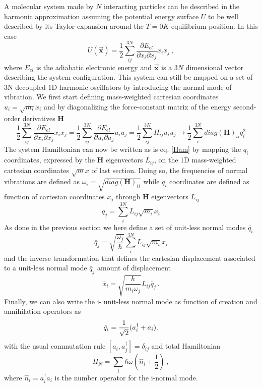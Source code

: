\documentclass[%
 reprint,onecolumn,
 amsmath,amssymb,
aps,
]{revtex4-1}
\begin{document}
A molecular system made by $N$ interacting particles can be described in the harmonic approximation assuming the potential energy surface $U$ to be well described by its Taylor expansion around the $T=0 K$ equilibrium position. In this case 
%
\begin{equation}
U(\vec{\mathbf{x}})=\frac{1}{2}\sum_{ij}^{3N}\frac{\partial E_{el}}{\partial x_{i}\partial x_{j}}x_{i}x_{j}\:,
\end{equation} 
%
where $E_{el}$ is the adiabatic electronic energy and $\vec{\mathbf{x}}$ is a $3N$ dimensional vector describing the system configuration. 
This system can still be mapped on a set of 3N decoupled 1D harmonic oscillators by introducing the normal mode of vibration. We first start defining mass-weighted cartesian coordinates $u_{i}=\sqrt{m_{i}}x_{i}$ and by diagonalizing the force-constant matrix of the energy second-order derivatives $\mathbf{H}$
%
\begin{equation}
\frac{1}{2}\sum_{ij}^{3N}\frac{\partial E_{el}}{\partial x_{i}\partial x_{j}}x_{i}x_{j}=\frac{1}{2}\sum_{ij}^{3N}\frac{\partial E_{el}}{\partial u_{i}\partial u_{j}}u_{i}u_{j}=\frac{1}{2}\sum_{ij}^{3N}H_{ij}u_{i}u_{j} \rightarrow \frac{1}{2}\sum_{i}^{3N}\textit{diag}(\mathbf{H})_{ii}q^{2}_{i}
\label{diagH}
\end{equation}
%
The system Hamiltonian can now be written as is eq. \ref{Ham} by mapping the $q_{i}$ coordinates, expressed by the $\mathbf{H}$ eigenvectors $L_{ij}$, on the 1D mass-weighted cartesian coordinates $\sqrt{m}x$ of last section. Doing so, the frequencies of normal vibrations are defined as $\omega_{i}=\sqrt{\textit{diag}(\mathbf{H})_{ii}}$ while $q_{i}$ coordinates are defined as function of cartesian coordinates $x_{j}$ through $\mathbf{H}$ eigenvectors $L_{ij}$
%
\begin{equation}
q_{j}=\sum_{i}^{3N}L_{ij}\sqrt{m_{i}}x_{i}
\end{equation}
%
As done in the previous section we here define a set of unit-less normal modes $\bar{q_{i}}$
\begin{equation}
\bar{q}_{j}=\sqrt{\frac{\omega_{j}}{\hbar}}\sum_{i}^{3N}L_{ij}\sqrt{m_{i}}x_{i}
\end{equation}
and the inverse transformation that defines the cartesian displacement associated to a unit-less normal mode $\bar{q}_{j}$ amount of displacement
%
\begin{equation}
\bar{x}_{i}=\sqrt{\frac{\hbar}{m_{i}\omega_{j}}}L_{ij}\bar{q}_{j}\:.
\end{equation}
%
Finally, we can also write the i- unit-less normal mode as function of creation and annihilation operators as
%
\begin{equation}
\bar{q}_{i}=\frac{1}{\sqrt{2}}\large(a^{\dag}_{i}+a_{i}\large).
\end{equation}
%
with the usual commutation rule $[a_{i},a_{j}^{\dag}]=\delta_{ij}$ and total Hamiltonian
%
\begin{equation}
H_{N}=\sum_{i}\hbar\omega(\hat{n}_{i}+\frac{1}{2}) \:,
\end{equation}
where $\hat{n}_{i}=a_{i}^{\dag}a_{i}$ is the number operator for the i-normal mode. 
\end{document}
